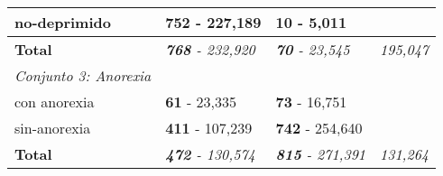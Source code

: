 \begin{table}[!hbt]
\begin{center}
\begin{tabular}{llll}
no-deprimido                                                & \textbf{752} - 227,189                                & \textbf{10} - 5,011                                   &                                                              \\ \hline
\rowcolor[HTML]{FFFFFF} 
\textbf{Total}                                              & \textit{\textbf{768} - 232,920}                       & \textit{\textbf{70} - 23,545}                         & \multicolumn{1}{c}{\cellcolor[HTML]{FFFFFF}\textit{195,047}}    \\ \hline
\rowcolor[HTML]{EFEFEF} 
\textit{Conjunto 3: Anorexia}                               & \multicolumn{1}{c}{\cellcolor[HTML]{EFEFEF}} & \multicolumn{1}{c}{\cellcolor[HTML]{EFEFEF}} &                                                              \\ \hline
\rowcolor[HTML]{FFFFFF} 
con anorexia                                                & \textbf{61} - 23,335                                  & \textbf{73} - 16,751                                  &                                                              \\ \hline
\rowcolor[HTML]{FFFFFF} 
sin-anorexia                                                & \textbf{411} - 107,239                                 & \textbf{742} - 254,640                                &                                                              \\ \hline
\rowcolor[HTML]{FFFFFF} 
\textbf{Total}                                              & \textit{\textbf{472} - 130,574}                       & \textit{\textbf{815} - 271,391}                       & \multicolumn{1}{c}{\cellcolor[HTML]{FFFFFF}\textit{131,264}}  \\ \hline
\end{tabular}

\end{center}

\end{table}
